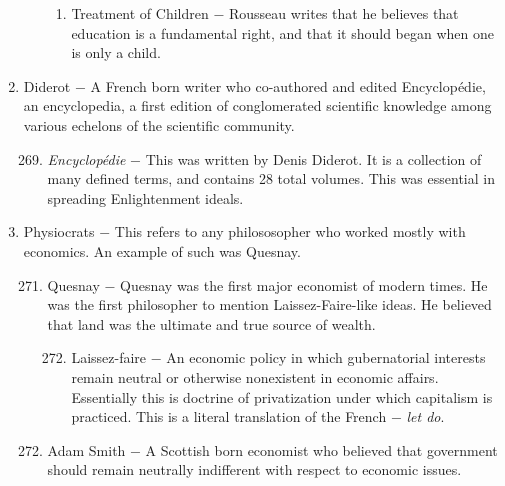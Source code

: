 \documentclass[12pt]{article}
\begin{document}
\begin{enumerate}
\begin{enumerate}[label=\arabic{*}.]
\begin{enumerate}[label=\arabic{*}.]
\item Treatment of Children $-$ Rousseau writes that he believes that education is a fundamental right, and that it should began when one is only a child.

\end{enumerate}
\end{enumerate}
\setcounter{enumi}{267}

\item Diderot $-$ A French born writer who co-authored and edited Encyclop\'edie, an encyclopedia, a first edition of conglomerated scientific knowledge among various echelons of the scientific community.

\begin{enumerate}[label=\arabic{*}.]
\setcounter{enumii}{268}

\item \textit{Encyclop\'edie} $-$ This was written by Denis Diderot. It is a collection of many defined terms, and contains 28 total volumes. This was essential in spreading Enlightenment ideals.

\end{enumerate}
\setcounter{enumi}{269}

\item Physiocrats $-$ This refers to any philososopher who worked mostly with economics. An example of such was Quesnay.

\begin{enumerate}[label=\arabic{*}.]
\setcounter{enumii}{270}

\item Quesnay $-$ Quesnay was the first major economist of modern times. He was the first philosopher to mention Laissez-Faire-like ideas. He believed that land was the ultimate and true source of wealth.

\begin{enumerate}[label=\arabic{*}.]
\setcounter{enumiii}{271}

\item Laissez-faire $-$ An economic policy in which gubernatorial interests remain neutral or otherwise nonexistent in economic affairs. Essentially this is doctrine of privatization under which capitalism is practiced. This is a literal translation of the French $-$ \textit{let do}.

\end{enumerate}
\setcounter{enumii}{272}

\item Adam Smith $-$ A Scottish born economist who believed that government should remain neutrally indifferent with respect to economic issues.


\end{enumerate}
\end{enumerate}
\end{document}
